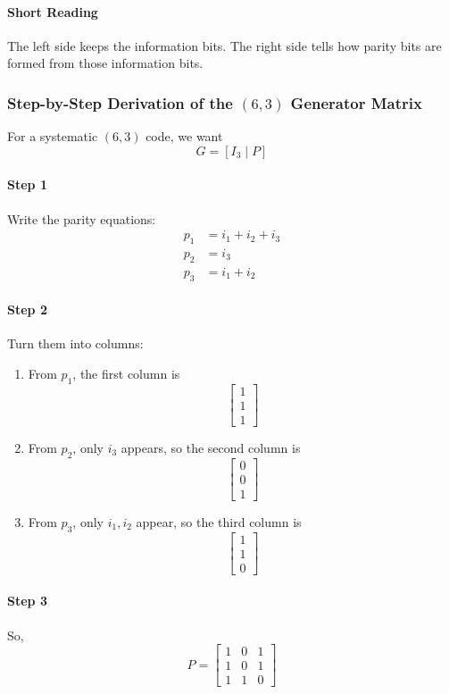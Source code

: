 \documentclass[11pt,a4paper]{book}
\begin{document}
\paragraph{Short Reading}
The left side keeps the information bits. The right side tells how parity bits are formed from those information bits.

\subsubsection{Step-by-Step Derivation of the \((6,3)\) Generator Matrix}

For a systematic \((6,3)\) code, we want
\[
G=[I_3\mid P]
\]

\paragraph{Step 1}
Write the parity equations:
\begin{align*}
p_1 &= i_1+i_2+i_3\\
p_2 &= i_3\\
p_3 &= i_1+i_2
\end{align*}

\paragraph{Step 2}
Turn them into columns:
\begin{enumerate}
    \item From \(p_1\), the first column is
    \[
    \begin{bmatrix}
    1\\1\\1
    \end{bmatrix}
    \]
    \item From \(p_2\), only \(i_3\) appears, so the second column is
    \[
    \begin{bmatrix}
    0\\0\\1
    \end{bmatrix}
    \]
    \item From \(p_3\), only \(i_1,i_2\) appear, so the third column is
    \[
    \begin{bmatrix}
    1\\1\\0
    \end{bmatrix}
    \]
\end{enumerate}

\paragraph{Step 3}
So,
\[
P=
\begin{bmatrix}
1&0&1\\
1&0&1\\
1&1&0
\end{bmatrix}
\]
\end{document}
